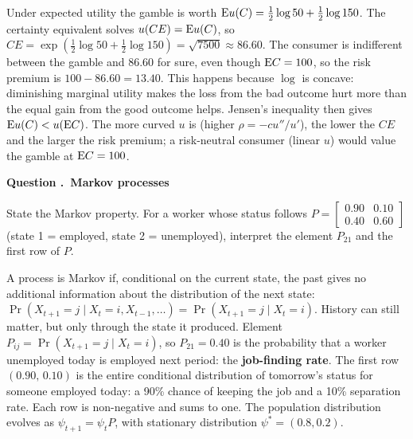 \documentclass[11pt]{article}
\newcounter{qn}
\newcommand{\question}[1]{\refstepcounter{qn}\par\medskip
{\bfseries\color{ink}Question \theqn.\ #1}\par\smallskip}
\begin{document}
\begin{answer}
\begin{minipage}[t]{0.56\textwidth}\vspace{0pt}
Under expected utility the gamble is worth $\mathrm{E} u(C)=\tfrac12\log50+\tfrac12\log150$. The certainty equivalent solves $u(CE)=\mathrm{E} u(C)$, so $CE=\exp(\tfrac12\log50+\tfrac12\log150)=\sqrt{7500}\approx\mathbf{86.60}$. The consumer is indifferent between the gamble and 86.60 for sure, even though $\mathrm{E} C=100$, so the risk premium is $100-86.60=13.40$. This happens because $\log$ is concave: diminishing marginal utility makes the loss from the bad outcome hurt more than the equal gain from the good outcome helps. Jensen's inequality then gives $\mathrm{E} u(C)<u(\mathrm{E} C)$. The more curved $u$ is (higher $\rho=-cu''/u'$), the lower the $CE$ and the larger the risk premium; a risk-neutral consumer (linear $u$) would value the gamble at $\mathrm{E} C=100$.
\end{minipage}\hfill
\begin{minipage}[t]{0.4\textwidth}\vspace{0pt}\centering
\figCE
\end{minipage}
\end{answer}

\question{Markov processes}
State the Markov property. For a worker whose status follows $P=\begin{bmatrix}0.90&0.10\\0.40&0.60\end{bmatrix}$ (state 1 = employed, state 2 = unemployed), interpret the element $P_{21}$ and the first row of $P$.

\begin{answer}
\begin{minipage}[t]{0.6\textwidth}\vspace{0pt}
A process is Markov if, conditional on the current state, the past gives no additional information about the distribution of the next state: $\Pr(X_{t+1}=j\mid X_t=i,X_{t-1},\dots)=\Pr(X_{t+1}=j\mid X_t=i)$. History can still matter, but only through the state it produced. Element $P_{ij}=\Pr(X_{t+1}=j\mid X_t=i)$, so $P_{21}=0.40$ is the probability that a worker unemployed today is employed next period: the \textbf{job-finding rate}. The first row $(0.90,\,0.10)$ is the entire conditional distribution of tomorrow's status for someone employed today: a 90\% chance of keeping the job and a 10\% separation rate. Each row is non-negative and sums to one. The population distribution evolves as $\psi_{t+1}=\psi_tP$, with stationary distribution $\psi^*=(0.8,0.2)$.
\end{minipage}\hfill
\begin{minipage}[t]{0.36\textwidth}\vspace{6pt}\centering
\figMarkov
\end{minipage}
\end{answer}
\end{document}
